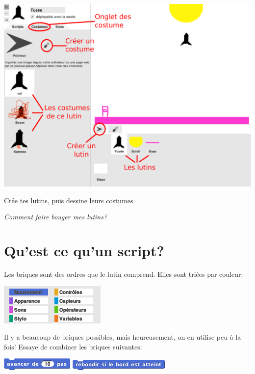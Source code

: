 \documentclass[a7paper,pagesize,DIV=14,10pt]{scrbook}
\begin{document}
\includegraphics[width=\linewidth]{img/snap-costume.pdf}

\bigskip%
Crée tes lutins, puis dessine leurs costumes.

\bigskip
\bigskip
\centerline{\it Comment faire bouger mes lutins?}

\newpage
\section*{Qu'est ce qu'un script?}
\vspace{-.7\baselineskip}
Les briques sont des ordres que le lutin comprend.
%
Elles sont triées par couleur:

\centerline{\includegraphics[width=.65\linewidth]{img/snap-categories.png}}

Il y a beaucoup de briques possibles, mais heureusement, on en utilise peu à la
fois!
%
Essaye de combiner les briques suivantes:

\includegraphics[scale=.45]{img/snap-avance.png}\hfill
\includegraphics[scale=.45]{img/snap-bump.png}
\end{document}
